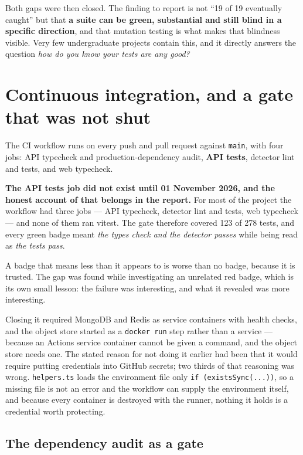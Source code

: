 Both gaps were then closed. The finding to report is not ``19 of 19
eventually caught'' but that \textbf{a suite can be green, substantial
and still blind in a specific direction}, and that mutation testing is
what makes that blindness visible. Very few undergraduate projects
contain this, and it directly answers the question \emph{how do you know
your tests are any good?}

\hypertarget{continuous-integration-and-a-gate-that-was-not-shut}{%
\section{Continuous integration, and a gate that was not
shut}\label{continuous-integration-and-a-gate-that-was-not-shut}}

The CI workflow runs on every push and pull request against
\texttt{main}, with four jobs: API typecheck and production-dependency
audit, \textbf{API tests}, detector lint and tests, and web typecheck.

\textbf{The API tests job did not exist until 01 November 2026, and the
honest account of that belongs in the report.} For most of the project
the workflow had three jobs --- API typecheck, detector lint and tests,
web typecheck --- and none of them ran vitest. The gate therefore
covered 123 of 278 tests, and every green badge meant \emph{the types
check and the detector passes} while being read as \emph{the tests
pass}.

A badge that means less than it appears to is worse than no badge,
because it is trusted. The gap was found while investigating an
unrelated red badge, which is its own small lesson: the failure was
interesting, and what it revealed was more interesting.

Closing it required MongoDB and Redis as service containers with health
checks, and the object store started as a \texttt{docker\ run} step
rather than a service --- because an Actions service container cannot be
given a command, and the object store needs one. The stated reason for
not doing it earlier had been that it would require putting credentials
into GitHub secrets; two thirds of that reasoning was wrong.
\texttt{helpers.ts} loads the environment file only
\texttt{if\ (existsSync(...))}, so a missing file is not an error and
the workflow can supply the environment itself, and because every
container is destroyed with the runner, nothing it holds is a credential
worth protecting.

\hypertarget{the-dependency-audit-as-a-gate}{%
\subsection{The dependency audit as a
gate}\label{the-dependency-audit-as-a-gate}}

